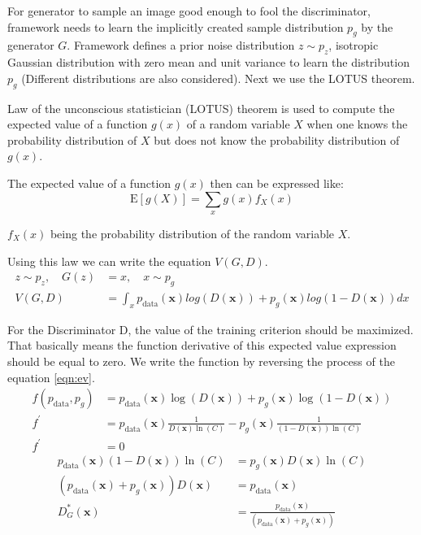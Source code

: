 For generator to sample an image good enough to fool the discriminator, framework needs to learn the
implicitly created sample distribution $p_g$ by the generator $G$. Framework defines a prior noise
distribution $z \sim p_z$, isotropic Gaussian distribution with zero mean and unit variance to learn
the distribution $p_g$ (Different distributions are also considered). Next we use the LOTUS theorem.

\begin{theorem}
Law of the unconscious statistician (LOTUS) theorem is used to compute the expected value of a 
function $g(x)$ of a random variable $X$  when one knows the probability distribution of $X$ but 
does not know the probability distribution of $g(x)$. \cite{ringner2009law}
\end{theorem}

The expected value of a function $g(x)$ then can be expressed like:
\begin{equation}
    \mathrm{E}[g(X)]=\sum_{x} g(x) f_{X}(x)  
\end{equation}

$f_{X}(x)$ being the probability distribution of the random variable $X$. 

Using this law we can write the equation $V(G, D)$. 
\begin{align}
    z \sim p_z , \quad G(z) &= x, \quad x \sim p_g\\ 
    V( G, D) &= \int_x p_{\text{data}}(\boldsymbol{x}) log(D(\boldsymbol{x})) + p_g(\boldsymbol{x}) log(1 - D(\boldsymbol{x})) dx
\end{align}

For the Discriminator D, the value of the training criterion should be maximized. That basically means the
function derivative of this expected value expression should be equal to zero. We write the
function by reversing the process of the equation \ref{eqn:ev}.
\begin{align}
    f( p_{\text{data}}, p_g) &= p_{\text{data}}(\boldsymbol{x}) \log(D(\boldsymbol{x})) + p_g(\boldsymbol{x}) \log(1 - D(\boldsymbol{x})) \\[5pt]
    f^{\prime} &= p_{\text{data}}(\boldsymbol{x}) \frac{1}{D(\boldsymbol{x}) \ln(C)} - p_g(\boldsymbol{x}) \frac{1}{(1- D(\boldsymbol{x})) \ln(C)} \\[5pt]
    f^{\prime} &= 0
\end{align}
\begin{align}
    p_{\text{data}}(\boldsymbol{x}) (1- D(\boldsymbol{x})) \ln(C) &= p_g(\boldsymbol{x}) D(\boldsymbol{x}) \ln(C)\\[5pt]
    (p_{\text{data}}(\boldsymbol{x}) +  p_g(\boldsymbol{x})) D(\boldsymbol{x}) &= p_{\text{data}}(\boldsymbol{x})\\[5pt]
    D^{*}_G(\boldsymbol{x}) &= \frac{p_{\text{data}}(\boldsymbol{x})}{(p_{\text{data}}(\boldsymbol{x}) +  p_g(\boldsymbol{x}))}\label{eqn:opt_d}
\end{align}

